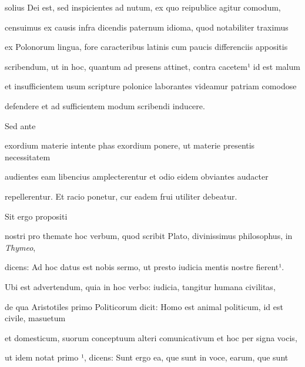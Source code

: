 solius Dei est, sed inspicientes ad nutum, ex quo reipublice agitur comodum,

censuimus ex causis infra dicendis paternum idioma, quod notabiliter traximus

ex Polonorum lingua, fore caracteribus latinis cum paucis differenciis appositis

scribendum, ut in hoc, quantum ad presens attinet, contra cacetem¹ id est malum

et insufficientem usum scripture polonice laborantes videamur patriam comodose

\splitlines{}
defendere et ad sufficientem modum scribendi inducere.

\indentK Sed ante

\fulllines{}

exordium materie intente phas exordium ponere, ut materie presentis necessitatem

audientes eam libencius amplecterentur et odio eidem obviantes audacter

\splitlines{}
repellerentur. Et racio ponetur, cur eadem frui utiliter debeatur.

\indentK Sit ergo propositi



\fulllines{}

nostri pro themate hoc verbum, quod scribit Plato, divinissimus philosophus, in \textit{Thymeo},


dicens: Ad hoc datus est nobis sermo, ut presto iudicia mentis nostre fierent¹.

Ubi est advertendum, quia in hoc verbo: iudicia, tangitur humana civilitas,

de qua Aristotiles primo Politicorum dicit: Homo est animal politicum, id est civile, masuetum

et domesticum, suorum conceptuum alteri comunicativum et hoc per signa vocis,


ut idem notat primo  ¹, dicens: Sunt ergo ea, que sunt in voce, earum, que sunt

